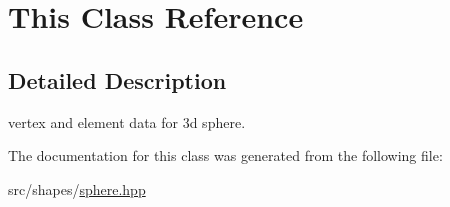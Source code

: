 \hypertarget{classThis}{}\section{This Class Reference}
\label{classThis}


\subsection{Detailed Description}
vertex and element data for 3d sphere. 

The documentation for this class was generated from the following file\+:\begin{DoxyCompactItemize}
\item 
src/shapes/\mbox{\hyperlink{sphere_8hpp}{sphere.\+hpp}}\end{DoxyCompactItemize}
